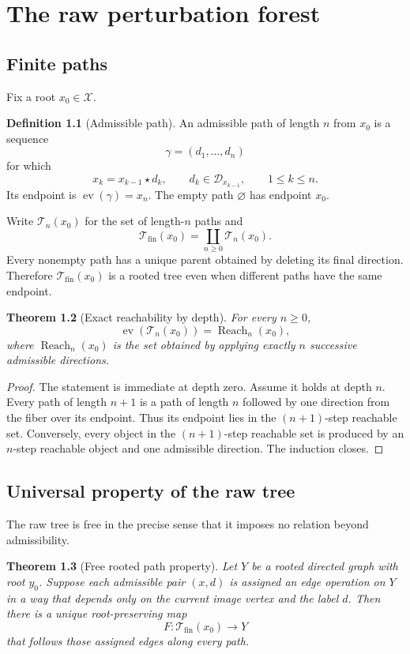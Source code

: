 \documentclass[11pt,openany]{report}
\newtheorem{theorem}{Theorem}[chapter]
\theoremstyle{definition}
\newtheorem{definition}[theorem]{Definition}
\theoremstyle{remark}
\newcommand{\Tcal}{\mathcal T}
\newcommand{\Dcal}{\mathcal D}
\newcommand{\Xcal}{\mathcal X}
\newcommand{\ev}{\operatorname{ev}}
\newcommand{\Reach}{\operatorname{Reach}}
\begin{document}
\chapter{The raw perturbation forest}

\section{Finite paths}

Fix a root $x_0\in\Xcal$.

\begin{definition}[Admissible path]
An admissible path of length $n$ from $x_0$ is a sequence
\[
\gamma=(d_1,\ldots,d_n)
\]
for which
\[
x_k=x_{k-1}\star d_k,
\qquad
d_k\in\Dcal_{x_{k-1}},
\qquad
1\le k\le n.
\]
Its endpoint is $\ev(\gamma)=x_n$. The empty path $\varnothing$ has endpoint $x_0$.
\end{definition}

Write $\Tcal_n(x_0)$ for the set of length-$n$ paths and
\[
\Tcal_{\mathrm{fin}}(x_0)=\coprod_{n\ge0}\Tcal_n(x_0).
\]
Every nonempty path has a unique parent obtained by deleting its final direction. Therefore $\Tcal_{\mathrm{fin}}(x_0)$ is a rooted tree even when different paths have the same endpoint.

\begin{theorem}[Exact reachability by depth]
For every $n\ge0$,
\[
\ev(\Tcal_n(x_0))
=
\Reach_n(x_0),
\]
where $\Reach_n(x_0)$ is the set obtained by applying exactly $n$ successive admissible directions.
\end{theorem}

\begin{proof}
The statement is immediate at depth zero. Assume it holds at depth $n$. Every path of length $n+1$ is a path of length $n$ followed by one direction from the fiber over its endpoint. Thus its endpoint lies in the $(n+1)$-step reachable set. Conversely, every object in the $(n+1)$-step reachable set is produced by an $n$-step reachable object and one admissible direction. The induction closes.
\end{proof}

\section{Universal property of the raw tree}

The raw tree is free in the precise sense that it imposes no relation beyond admissibility.

\begin{theorem}[Free rooted path property]
Let $Y$ be a rooted directed graph with root $y_0$. Suppose each admissible pair $(x,d)$ is assigned an edge operation on $Y$ in a way that depends only on the current image vertex and the label $d$. Then there is a unique root-preserving map
\[
F:\Tcal_{\mathrm{fin}}(x_0)\longrightarrow Y
\]
that follows those assigned edges along every path.
\end{theorem}
\end{document}
